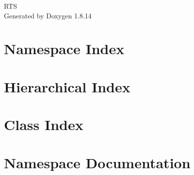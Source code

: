 \documentclass[twoside]{book}
\newcommand{\+}{\discretionary{\mbox{\scriptsize$\hookleftarrow$}}{}{}}
\newcommand{\clearemptydoublepage}{%
  \newpage{\pagestyle{empty}\cleardoublepage}%
}
\begin{document}
\hypersetup{pageanchor=false,
             bookmarksnumbered=true,
             pdfencoding=unicode
            }
\begin{titlepage}
\vspace*{7cm}
\begin{center}%
{\Large R\+TS }\\
\vspace*{1cm}
{\large Generated by Doxygen 1.8.14}\\
\end{center}
\end{titlepage}
\clearemptydoublepage
{}
\tableofcontents
\clearemptydoublepage
{}
\hypersetup{pageanchor=true}

\chapter{Namespace Index}

\chapter{Hierarchical Index}

\chapter{Class Index}

\chapter{Namespace Documentation}






\end{document}
